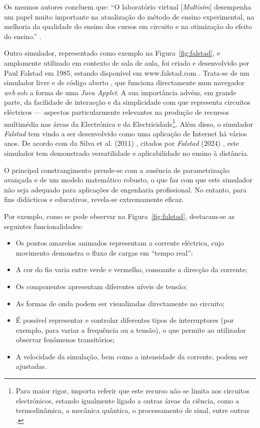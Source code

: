 Os mesmos autores concluem que: ``O laboratório virtual [\textit{Multisim}] desempenha um papel muito importante na atualização do método de ensino experimental, na melhoria da qualidade do ensino dos cursos em circuito e na otimização do efeito do ensino.'' \cite{heying}.

Outro simulador, representado como exemplo na Figura~\ref{fig:falstad}, e amplamente utilizado em contexto de sala de aula, foi criado e desenvolvido por Paul Falstad em 1985, estando disponível em www.falstad.com \cite{falstad}. Trata-se de um simulador livre e de código aberto \cite{falstadlicenca}, que funciona directamente num navegador \textit{web} sob a forma de uma \textit{Java Applet}. A sua importância advém, em grande parte, da facilidade de interacção e da simplicidade com que representa circuitos eléctricos — aspectos particularmente relevantes na produção de recursos multimédia nas áreas da Electrónica e da Electricidade\footnote{Para maior rigor, importa referir que este recurso não se limita aos circuitos electrónicos, estando igualmente ligado a outras áreas da ciência, como a termodinâmica, a mecânica quântica, o processamento de sinal, entre outras \cite{falstadcompleto}.}. Além disso, o simulador \textit{Falstad} tem vindo a ser desenvolvido como uma aplicação de Internet há vários anos. De acordo com da Silva et al. (2011) \cite{RemoteTeachingElectricalCircuits}, citados por \textit{Falstad} (2024) \cite{falstad}, este simulador tem demonstrado versatilidade e aplicabilidade no ensino à distância.

O principal constrangimento prende-se com a ausência de parametrização avançada e de um modelo matemático robusto, o que faz com que este simulador não seja adequado para aplicações de engenharia profissional. No entanto, para fins didácticos e educativos, revela-se extremamente eficaz.

Por exemplo, como se pode observar na Figura~\ref{fig:falstad}, destacam-se as seguintes funcionalidades:

\begin{itemize}
    \item Os pontos amarelos animados representam a corrente eléctrica, cujo movimento demonstra o fluxo de cargas em ``tempo real'';
    \item A cor do fio varia entre verde e vermelho, consoante a direcção da corrente;
    \item Os componentes apresentam diferentes níveis de tensão;
    \item As formas de onda podem ser visualizadas directamente no circuito;
    \item É possível representar e controlar diferentes tipos de interruptores (por exemplo, para variar a frequência ou a tensão), o que permite ao utilizador observar fenómenos transitórios;
    \item A velocidade da simulação, bem como a intensidade da corrente, podem ser ajustadas.
\end{itemize}

